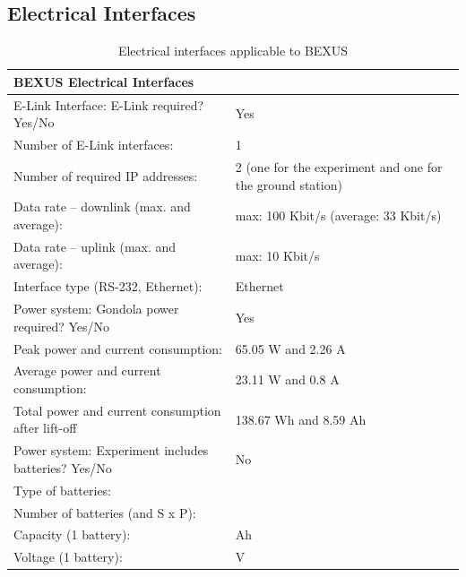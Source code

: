 \documentclass[
  a4paper,
  11pt,
  openany,
  parskip,
  toc=totoc,
  listof=totoc,
  bibliography=totoc
]{scrreprt}
\begin{document}
\subsection{Electrical Interfaces}

\begin{table}[htbp]
\centering
\caption{Electrical interfaces applicable to BEXUS}
\label{tab:electrical_interfaces_bexus}
\begin{tabular}{p{10cm} p{5cm}}
\toprule
\multicolumn{2}{l}{\textbf{BEXUS Electrical Interfaces}} \\
\midrule
E-Link Interface: E-Link required? Yes/No & Yes\\
Number of E-Link interfaces: & 1 \\
Number of required IP addresses: & 2 (one for the experiment and one for the ground station)\\
Data rate -- downlink (max. and average): & max: 100 Kbit/s  (average: 33 Kbit/s) \\
Data rate -- uplink (max. and average): & max: 10 Kbit/s \\
Interface type (RS-232, Ethernet): & Ethernet \\
\midrule
Power system: Gondola power required? Yes/No & Yes\\
Peak power and current consumption: & 65.05 W and 2.26 A \\
Average power and current consumption: & 23.11 W and 0.8 A \\
Total power and current consumption after lift-off & 138.67 Wh and 8.59 Ah \\
\midrule
Power system: Experiment includes batteries? Yes/No & No\\
Type of batteries: & \\
Number of batteries (and S x P): & \\
Capacity (1 battery): & Ah \\
Voltage (1 battery): & V \\
\bottomrule
\end{tabular}
\end{table}
\clearpage

\end{document}
